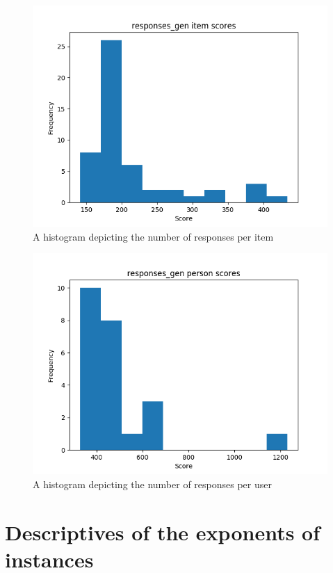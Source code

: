 \begin{figure}
\includegraphics[width=\textwidth]{img/responses_gen_diff.png}
    \caption{A histogram depicting the number of responses per item}
    \label{fig:responses_gen_diff}
\end{figure}
\begin{figure}
\includegraphics[width=\textwidth]{img/responses_gen_abil.png}
    \caption{A histogram depicting the number of responses per user}
    \label{fig:responses_gen_abil}
\end{figure}

\section{Descriptives of the exponents of instances}

